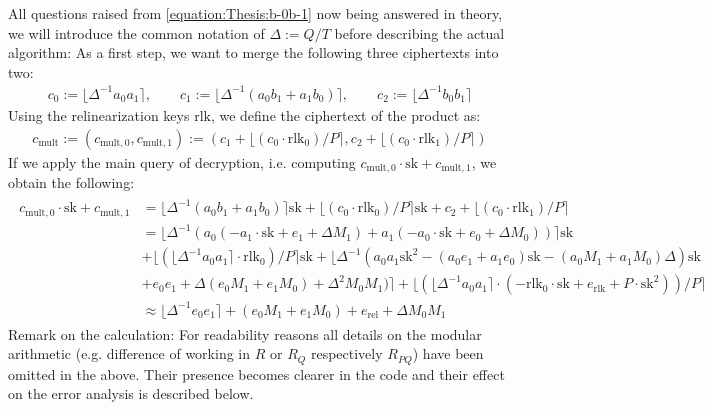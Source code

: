 \documentclass[letterpaper,10pt,english]{jupyterBook}
\begin{document}
\sphinxAtStartPar
All questions raised from \eqref{equation:Thesis:b-0b-1} now being answered in theory, we will introduce the common notation of \(\Delta := Q/T\) before describing the actual algorithm:
As a first step, we want to merge the following three ciphertexts into two:
\begin{equation*}
\begin{split}
c_0 := \lfloor \Delta^{-1} a_0a_1 \rceil, \qquad c_1 := \lfloor \Delta^{-1} (a_0b_1+a_1b_0) \rceil, \qquad c_2 := \lfloor \Delta^{-1} b_0b_1 \rceil
\end{split}
\end{equation*}
\sphinxAtStartPar
Using the relinearization keys \(\mathrm{rlk}\), we define the ciphertext of the product as:
\begin{equation*}
\begin{split}
c_{\text{mult}} := (c_{\text{mult},0},c_{\text{mult},1}) :=  (c_1 + \lfloor(c_0 \cdot \mathrm{rlk}_0) / P\rceil , c_2 + \lfloor (c_0 \cdot \mathrm{rlk}_1) / P \rceil)
\end{split}
\end{equation*}
\sphinxAtStartPar
If we apply the main query of decryption, i.e. computing \(c_{\text{mult},0}\cdot \mathrm{sk} + c_{\text{mult},1}\), we obtain the following:
\begin{equation*}
\begin{split}\begin{split}
c_{\text{mult},0} \cdot \mathrm{sk} + c_{\text{mult},1} &= \lfloor \Delta^{-1} (a_0b_1+a_1b_0) \rceil \mathrm{sk} + \lfloor(c_0 \cdot \mathrm{rlk}_0) / P\rceil \mathrm{sk} + c_2 + \lfloor (c_0 \cdot \mathrm{rlk}_1) / P \rceil\\
    &= \lfloor \Delta^{-1} (a_0(-a_1\cdot \mathrm{sk} + e_1 + \Delta M_1)+a_1(-a_0\cdot \mathrm{sk} + e_0 + \Delta M_0)) \rceil \mathrm{sk} \\
    &+ \lfloor(\lfloor \Delta^{-1} a_0a_1 \rceil \cdot \mathrm{rlk}_0) / P\rceil \mathrm{sk} + \lfloor \Delta^{-1}  (a_0a_1 \mathrm{sk}^2 - (a_0e_1+a_1e_0)\mathrm{sk} - (a_0M_1+a_1M_0)\Delta)\mathrm{sk} \\
    &+ e_0e_1 + \Delta (e_0M_1 +e_1M_0) + \Delta^2 M_0M_1) \rceil + \lfloor (\lfloor \Delta^{-1} a_0a_1 \rceil \cdot (- \mathrm{rlk}_0 \cdot \mathrm{sk} + e_{\text{rlk}} + P\cdot\mathrm{sk}^2 )) / P \rceil \\
    &\approx \lfloor \Delta^{-1} e_0e_1 \rceil + (e_0M_1+e_1M_0) + e_{\text{rel}} + \Delta M_0 M_1
\end{split}\end{split}
\end{equation*}
\sphinxAtStartPar
Remark on the calculation:
For readability reasons all details on the modular arithmetic (e.g. difference of working in \(R\) or \(R_Q\) respectively \(R_{PQ}\)) have been omitted in the above.
Their presence becomes clearer in the code and their effect on the error analysis is described below.
\end{document}
